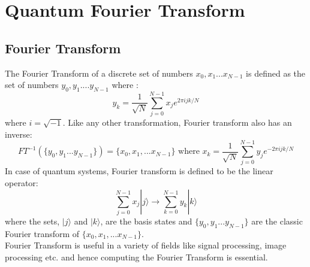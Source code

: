 \chapter{Quantum Fourier Transform}
\section{Fourier Transform}
The Fourier Transform of a discrete set of numbers $x_0,x_1 ... x_{N-1}$ is defined as the set of numbers $y_0,y_1....y_{N-1}$ where :
\begin{equation}
y_k = \frac{1}{\sqrt{N}} \sum_{j=0}^{N-1} x_j e^{2 \pi ijk/N }
\end{equation}where $i = \sqrt{-1}$. Like any other transformation, Fourier transform also has an inverse:
\begin{equation}
FT^{-1}(\{y_0,y_1...y_{N-1}\}) = \{x_0,x_1,...x_{N-1}\} \text{ where } x_k = \frac{1}{\sqrt{N}} \sum_{j=0}^{N-1} y_j e^{-2 \pi ijk/N }
\end{equation}
In case of quantum systems, Fourier transform is defined to be the linear operator:
\begin{equation}
\sum_{j=0}^{N-1} x_j|j\rangle \rightarrow \sum_{k=0}^{N-1} y_k|k\rangle
\end{equation}where the sets, $|j\rangle$ and $|k\rangle$, are the basis states and $\{y_0,y_1...y_{N-1}\}$ are the classic Fourier transform of $\{x_0,x_1,...x_{N-1}\}$.\\
Fourier Transform is useful in a variety of fields like signal processing, image processing etc. and hence computing the Fourier Transform is essential. \\
